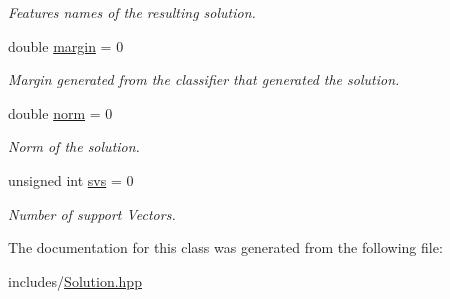 \begin{DoxyCompactItemize}
\begin{DoxyCompactList}\small\item\em Features names of the resulting solution. \end{DoxyCompactList}\item 
double \hyperlink{class_solution_a3580af26a22d86e44df701f654165e0f}{margin} = 0\hypertarget{class_solution_a3580af26a22d86e44df701f654165e0f}{}\label{class_solution_a3580af26a22d86e44df701f654165e0f}

\begin{DoxyCompactList}\small\item\em Margin generated from the classifier that generated the solution. \end{DoxyCompactList}\item 
double \hyperlink{class_solution_acbc0610c1c2e2d7bb5c39af33b7eb99c}{norm} = 0\hypertarget{class_solution_acbc0610c1c2e2d7bb5c39af33b7eb99c}{}\label{class_solution_acbc0610c1c2e2d7bb5c39af33b7eb99c}

\begin{DoxyCompactList}\small\item\em Norm of the solution. \end{DoxyCompactList}\item 
unsigned int \hyperlink{class_solution_ae9f64bc0520b7c42d3c395f48748eca5}{svs} = 0\hypertarget{class_solution_ae9f64bc0520b7c42d3c395f48748eca5}{}\label{class_solution_ae9f64bc0520b7c42d3c395f48748eca5}

\begin{DoxyCompactList}\small\item\em Number of support Vectors. \end{DoxyCompactList}\end{DoxyCompactItemize}


The documentation for this class was generated from the following file\+:\begin{DoxyCompactItemize}
\item 
includes/\hyperlink{_solution_8hpp}{Solution.\+hpp}\end{DoxyCompactItemize}
